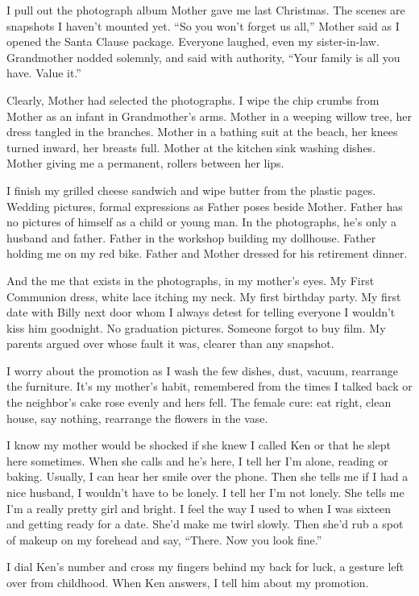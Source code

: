 \documentclass[
]{article}
\begin{document}
I pull out the photograph album Mother gave me last Christmas. The
scenes are snapshots I haven't mounted yet. ``So you won't forget us
all,'' Mother said as I opened the Santa Clause package. Everyone
laughed, even my sister-in-law. Grandmother nodded solemnly, and said
with authority, ``Your family is all you have. Value it.''

Clearly, Mother had selected the photographs. I wipe the chip crumbs
from Mother as an infant in Grandmother's arms. Mother in a weeping
willow tree, her dress tangled in the branches. Mother in a bathing suit
at the beach, her knees turned inward, her breasts full. Mother at the
kitchen sink washing dishes. Mother giving me a permanent, rollers
between her lips.

I finish my grilled cheese sandwich and wipe butter from the plastic
pages. Wedding pictures, formal expressions as Father poses beside
Mother. Father has no pictures of himself as a child or young man. In
the photographs, he's only a husband and father. Father in the workshop
building my dollhouse. Father holding me on my red bike. Father and
Mother dressed for his retirement dinner.

And the me that exists in the photographs, in my mother's eyes. My First
Communion dress, white lace itching my neck. My first birthday party. My
first date with Billy next door whom I always detest for telling
everyone I wouldn't kiss him goodnight. No graduation pictures. Someone
forgot to buy film. My parents argued over whose fault it was, clearer
than any snapshot.

I worry about the promotion as I wash the few dishes, dust, vacuum,
rearrange the furniture. It's my mother's habit, remembered from the
times I talked back or the neighbor's cake rose evenly and hers fell.
The female cure: eat right, clean house, say nothing, rearrange the
flowers in the vase.

I know my mother would be shocked if she knew I called Ken or that he
slept here some­times. When she calls and he's here, I tell her I'm
alone, reading or baking. Usually, I can hear her smile over the phone.
Then she tells me if I had a nice husband, I wouldn't have to be lonely.
I tell her I'm not lonely. She tells me I'm a really pretty girl and
bright. I feel the way I used to when I was sixteen and getting ready
for a date. She'd make me twirl slowly. Then she'd rub a spot of makeup
on my forehead and say, ``There. Now you look fine.''

I dial Ken's number and cross my fingers behind my back for luck, a
gesture left over from childhood. When Ken answers, I tell him about my
promotion.
\end{document}
